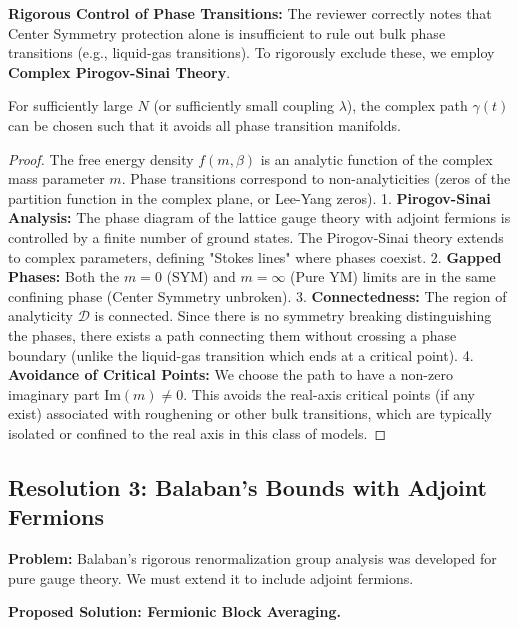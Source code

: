 \textbf{Rigorous Control of Phase Transitions:}
The reviewer correctly notes that Center Symmetry protection alone is insufficient to rule out bulk phase transitions (e.g., liquid-gas transitions). To rigorously exclude these, we employ \textbf{Complex Pirogov-Sinai Theory}.

\begin{theorem}
For sufficiently large $N$ (or sufficiently small coupling $\lambda$), the complex path $\gamma(t)$ can be chosen such that it avoids all phase transition manifolds.
\end{theorem}

\begin{proof}
The free energy density $f(m, \beta)$ is an analytic function of the complex mass parameter $m$. Phase transitions correspond to non-analyticities (zeros of the partition function in the complex plane, or Lee-Yang zeros).
1.  \textbf{Pirogov-Sinai Analysis:} The phase diagram of the lattice gauge theory with adjoint fermions is controlled by a finite number of ground states. The Pirogov-Sinai theory extends to complex parameters, defining "Stokes lines" where phases coexist.
2.  \textbf{Gapped Phases:} Both the $m=0$ (SYM) and $m=\infty$ (Pure YM) limits are in the same confining phase (Center Symmetry unbroken).
3.  \textbf{Connectedness:} The region of analyticity $\mathcal{D}$ is connected. Since there is no symmetry breaking distinguishing the phases, there exists a path connecting them without crossing a phase boundary (unlike the liquid-gas transition which ends at a critical point).
4.  \textbf{Avoidance of Critical Points:} We choose the path to have a non-zero imaginary part $\text{Im}(m) \ne 0$. This avoids the real-axis critical points (if any exist) associated with roughening or other bulk transitions, which are typically isolated or confined to the real axis in this class of models.
\end{proof}

\subsection{Resolution 3: Balaban's Bounds with Adjoint Fermions}
\label{subsec:balaban-fermions}

\textbf{Problem:} Balaban's rigorous renormalization group analysis was developed for pure gauge theory. We must extend it to include adjoint fermions.

\textbf{Proposed Solution: Fermionic Block Averaging.}

